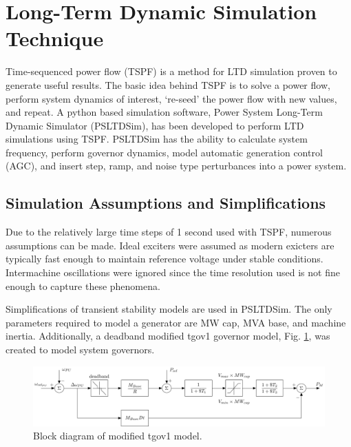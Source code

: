 \section{Long-Term Dynamic Simulation Technique}
Time-sequenced power flow (TSPF) is a method for LTD simulation proven to generate useful results\cite{DonnellyVoltageControl}.
The basic idea behind TSPF is to solve a power flow, perform system dynamics of interest, `re-seed' the power flow with new values, and repeat.
A python based simulation software, Power System Long-Term Dynamic Simulator (PSLTDSim), has been developed to perform LTD simulations using TSPF.
PSLTDSim has the ability to calculate system frequency, perform governor dynamics, model automatic generation control (AGC), and insert step, ramp, and noise type perturbances into a power system.

\subsection{Simulation Assumptions and Simplifications}
Due to the relatively large time steps of 1 second used with TSPF, numerous assumptions can be made.
Ideal exciters were assumed as modern exicters are typically fast enough to maintain reference voltage under stable conditions.
Intermachine oscillations were ignored since the time resolution used is not fine enough to capture these phenomena.

Simplifications of transient stability models are used in PSLTDSim.
The only parameters required to model a generator are MW cap, MVA base, and machine inertia.
Additionally, a deadband modified tgov1 governor model, Fig. \ref{fig: tgov1BlockDiagram},  was created to model system governors.

\begin{figure}[!ht]
	\centering
	\includegraphics[width=\linewidth]{figures/tgov1DB}
	\caption{Block diagram of modified tgov1 model.}
	\label{fig: tgov1BlockDiagram}
\end{figure}

